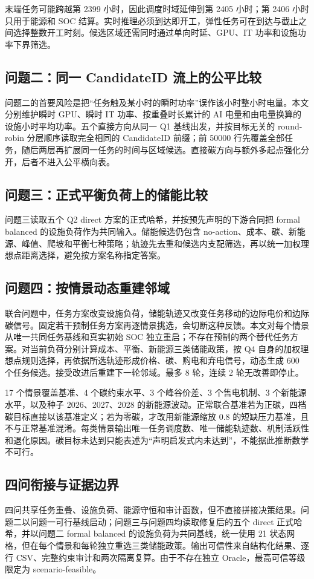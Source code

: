 \documentclass[withoutpreface,bwprint]{cumcmthesis}
\begin{document}
末端任务可能跨越第 2399 小时，因此调度时域延伸到第 2405 小时；第 2406 小时只用于能源和 SOC 结算。实时推理必须到达即开工，弹性任务可在到达与截止之间选择整数开工时刻。候选区域还需同时通过单向时延、GPU、IT 功率和设施功率下界筛选。

\subsection{问题二：同一 CandidateID 流上的公平比较}
问题二的首要风险是把“任务触及某小时的瞬时功率”误作该小时整小时电量。本文分别维护瞬时 GPU、瞬时 IT 功率、按重叠时长累计的 AI 电量和由电量换算的设施小时平均功率。五个直接方向从同一 Q1 基线出发，并按目标无关的 round-robin 分层顺序读取完全相同的 CandidateID 前缀；前 50000 行先覆盖全部任务，随后两层再扩展同一任务的时间与区域候选。直接碳方向与额外多起点强化分开，后者不进入公平横向表。

\subsection{问题三：正式平衡负荷上的储能比较}
问题三读取五个 Q2 direct 方案的正式哈希，并按预先声明的下游合同把 formal balanced 的设施负荷作为共同输入。储能候选仍包含 no-action、成本、碳、新能源、峰值、爬坡和平衡七种策略；轨迹先去重和候选内支配筛选，再以统一加权理想点距离选择，避免按方案名称指定答案。

\subsection{问题四：按情景动态重建邻域}
联合问题中，任务方案改变设施负荷，储能轨迹又改变任务移动的边际电价和边际碳信号。固定若干预制任务方案再逐情景挑选，会切断这种反馈。本文对每个情景从唯一共同任务基线和真实初始 SOC 独立重启；不存在预制的两个替代任务方案。对当前负荷分别计算成本、平衡、新能源三类储能政策，按 Q4 自身的加权理想点规则选择，再依据所选轨迹形成价格、碳、购电和弃电信号，动态生成 600 个任务候选。接受改进后重建下一轮邻域。最多 8 轮，连续 2 轮无改善即停止。

17 个情景覆盖基准、4 个碳约束水平、3 个峰谷价差、3 个售电机制、3 个新能源水平，以及种子 2026、2027、2028 的新能源波动。正常联合基准若为正碳，四档碳目标直接以该基准定义；若为零碳，才改用新能源缩放 0.8 的短缺压力基准，且不与正常基准混淆。每类情景输出唯一任务调度数、唯一储能轨迹数、机制活跃性和退化原因。碳目标未达到只能表述为“声明启发式内未达到”，不能据此推断数学不可行。

\subsection{四问衔接与证据边界}
四问共享任务重叠、设施负荷、能源守恒和审计函数，但不直接拼接决策结果。问题二以问题一可行基线启动；问题三与问题四均读取修复后的五个 direct 正式哈希，并以问题二 formal balanced 的设施负荷为共同基线，统一使用 21 状态网格，但在每个情景和每轮独立重选三类储能政策。输出可信性来自结构化结果、逐行 CSV、完整约束审计和两次隔离复算。由于不存在独立 Oracle，最高可信等级限定为 scenario-feasible。
\end{document}
